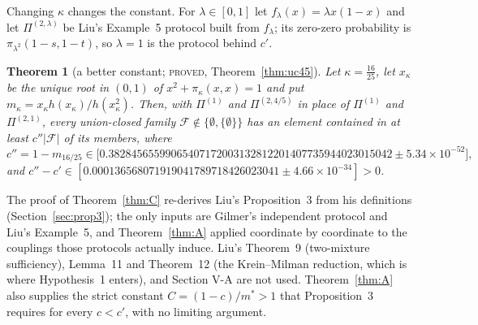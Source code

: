 \documentclass[11pt]{article}
\theoremstyle{plain}
\newtheorem{theorem}{Theorem}[section]
\theoremstyle{definition}
\theoremstyle{remark}
\newcommand{\lbl}[1]{\textsc{#1}}
\begin{document}
Changing $\kappa$ changes the constant.  For $\lambda\in[0,1]$ let
$f_\lambda(x)=\lambda x(1-x)$ and let $\Pi^{(2,\lambda)}$ be Liu's Example~5
protocol built from $f_\lambda$; its zero-zero probability is
$\pi_{\lambda^2}(1-s,1-t)$, so $\lambda=1$ is the protocol behind $c'$.

\begin{theorem}[a better constant; \lbl{proved}, Theorem~\ref{thm:uc45}]\label{thm:D}
Let $\kappa=\tfrac{16}{25}$, let $x_\kappa$ be the unique root in $(0,1)$ of
$x^2+\pi_\kappa(x,x)=1$ and put $m_\kappa=x_\kappa h(x_\kappa)/h(x_\kappa^2)$.
Then, with $\Pi^{(1)}$ and $\Pi^{(2,4/5)}$ in place of $\Pi^{(1)}$ and
$\Pi^{(2,1)}$, every union-closed family
$\mathcal F\notin\{\emptyset,\{\emptyset\}\}$ has an element contained in at
least $c''|\mathcal F|$ of its members, where
\[
  c''=1-m_{16/25}\in\bigl[0.38284565599065407172003132812201407735944023015042
  \pm5.34\times10^{-52}\bigr],
\]
and $c''-c'\in[0.000136568071919041789718426023041\pm4.66\times10^{-34}]>0$.
\end{theorem}

The proof of Theorem~\ref{thm:C} re-derives Liu's Proposition~3 from his
definitions (Section~\ref{sec:prop3}); the only inputs are Gilmer's
independent protocol and Liu's Example~5, and Theorem~\ref{thm:A} applied
coordinate by coordinate to the couplings those protocols actually induce.
Liu's Theorem~9 (two-mixture sufficiency), Lemma~11 and Theorem~12 (the
Krein--Milman reduction, which is where Hypothesis~1 enters), and Section
V-A are not used.  Theorem~\ref{thm:A} also supplies the strict constant
$C=(1-c)/m^\ast>1$ that Proposition~3 requires for every $c<c'$, with no
limiting argument.
\end{document}
